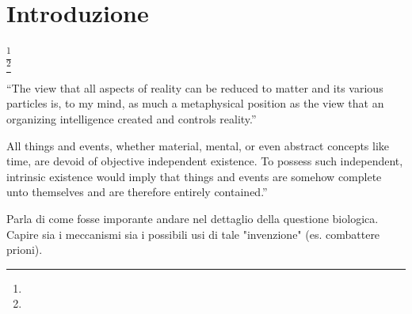 \chapter{Introduzione}

\footnote{} \\

\footnote{}


“The view that all aspects of reality can be reduced to matter and its various particles is, to my mind, as much a metaphysical position as the view that an organizing intelligence created and controls reality.”

 All things and events, whether material, mental, or even abstract concepts like time, are devoid of objective independent existence. To possess such independent, intrinsic existence would imply that things and events are somehow complete unto themselves and are therefore entirely contained.”
 
 
 
 Parla di come fosse imporante andare nel dettaglio della questione biologica. Capire sia i meccanismi sia i possibili usi di tale "invenzione" (es. combattere prioni).

\clearpage

